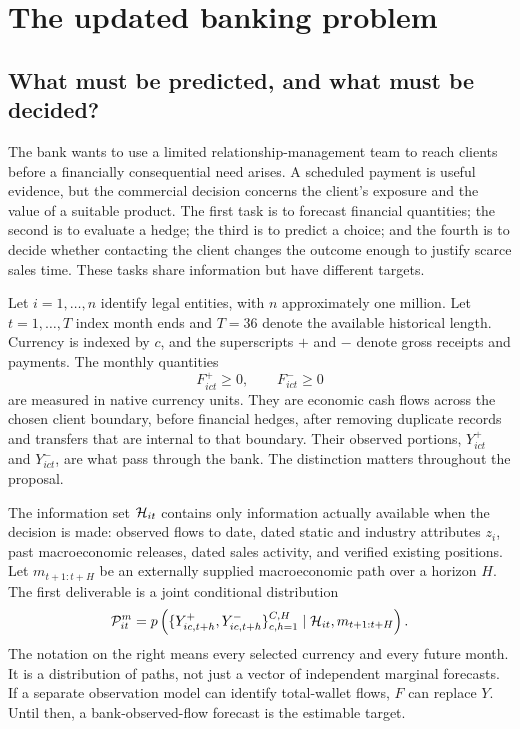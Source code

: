\chapter{The updated banking problem}
\label{ch:problem}
\section{What must be predicted, and what must be decided?}
The bank wants to use a limited relationship-management team to reach clients before a financially consequential need arises. A scheduled payment is useful evidence, but the commercial decision concerns the client's exposure and the value of a suitable product. The first task is to forecast financial quantities; the second is to evaluate a hedge; the third is to predict a choice; and the fourth is to decide whether contacting the client changes the outcome enough to justify scarce sales time. These tasks share information but have different targets.

Let $i=1,\ldots,n$ identify legal entities, with $n$ approximately one million. Let $t=1,\ldots,T$ index month ends and $T=36$ denote the available historical length. Currency is indexed by $c$, and the superscripts $+$ and $-$ denote gross receipts and payments. The monthly quantities
\begin{equation}
F^+_{ict}\geq0,\qquad F^-_{ict}\geq0
\end{equation}
are measured in native currency units. They are economic cash flows across the chosen client boundary, before financial hedges, after removing duplicate records and transfers that are internal to that boundary. Their observed portions, $Y^+_{ict}$ and $Y^-_{ict}$, are what pass through the bank. The distinction matters throughout the proposal.

The information set $\mathcal H_{it}$ contains only information actually available when the decision is made: observed flows to date, dated static and industry attributes $z_i$, past macroeconomic releases, dated sales activity, and verified existing positions. Let $m_{t+1:t+H}$ be an externally supplied macroeconomic path over a horizon $H$. The first deliverable is a joint conditional distribution
\begin{equation}
\mathcal P_{it}^{m}=
 p\left(\{Y^+_{ic,t+h},Y^-_{ic,t+h}\}_{c,h=1}^{C,H}
 \mid\mathcal H_{it},m_{t+1:t+H}\right).
\label{eq:forecasttarget}
\end{equation}
The notation on the right means every selected currency and every future month. It is a distribution of paths, not just a vector of independent marginal forecasts. If a separate observation model can identify total-wallet flows, $F$ can replace $Y$. Until then, a bank-observed-flow forecast is the estimable target.

